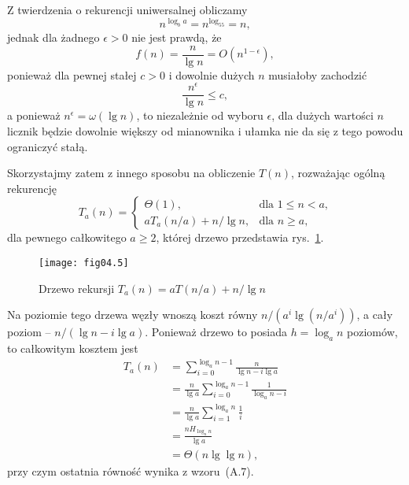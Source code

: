 \subexercise{} %
Z twierdzenia o rekurencji uniwersalnej obliczamy
\[
	n^{\log_ba} = n^{\log_55} = n,
\]
jednak dla żadnego $\epsilon>0$ nie jest prawdą, że
\[
	f(n) = \frac{n}{\lg n} = O(n^{1-\epsilon}),
\]
ponieważ dla pewnej stałej $c>0$ i dowolnie dużych $n$ musiałoby zachodzić
\[
	\frac{n^\epsilon}{\lg n} \le c,
\]
a ponieważ $n^\epsilon=\omega(\lg n)$, to niezależnie od wyboru $\epsilon$, dla dużych wartości $n$ licznik będzie dowolnie większy od mianownika i ułamka nie da się z tego powodu ograniczyć stałą.

Skorzystajmy zatem z innego sposobu na obliczenie $T(n)$, rozważając ogólną rekurencję
\[
	T_a(n) = \begin{cases}
		\Theta(1), & \text{dla $1\le n<a$,} \\
		aT_a(n/a)+n/\!\lg n, & \text{dla $n\ge a$,}
	\end{cases}
\]
dla pewnego całkowitego $a\ge2$, której drzewo przedstawia rys.~\ref{fig:4-4b}.
\begin{figure}[ht]
	\begin{center}
		\texttt{[image: fig04.5]}
	\end{center}
	\caption{Drzewo rekursji $T_a(n)=aT(n/a)+n/\!\lg n$} \label{fig:4-4b}
\end{figure}

Na  poziomie tego drzewa węzły wnoszą koszt równy $n/(a^i\lg(n/a^i))$, a cały poziom -- $n/(\lg n-i\lg a)$. Ponieważ drzewo to posiada $h=\log_an$ poziomów, to całkowitym kosztem jest
\begin{align*}
	T_a(n) &= \sum_{i=0}^{\log_an-1}\frac{n}{\lg n-i\lg a} \\
	&= \frac{n}{\lg a}\sum_{i=0}^{\log_an-1}\frac{1}{\log_an-i} \\
	&= \frac{n}{\lg a}\sum_{i=1}^{\log_an}\frac{1}{i} \\
	&= \frac{nH_{\log_an}}{\lg a} \\
	&= \Theta(n\lg\lg n),
\end{align*}
przy czym ostatnia równość wynika z wzoru~(A.7).

